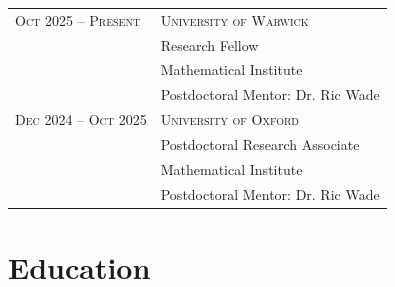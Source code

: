 \documentclass[a4paper,10pt]{article} %
\begin{document}
\begin{longtable}{>{\raggedleft\arraybackslash}p{4cm}p{10cm}}

\textsc{Oct 2025 -- Present} & \textsc{University of Warwick} \vspace{0.2em} \\
& Research Fellow \\
& Mathematical Institute \\
& \quad Postdoctoral Mentor: Dr. Ric Wade \vspace{0.2em}\\

\textsc{Dec 2024 -- Oct 2025} & \textsc{University of Oxford} \vspace{0.2em} \\
& Postdoctoral Research Associate \\
& Mathematical Institute \\
& \quad Postdoctoral Mentor: Dr. Ric Wade

\end{longtable}


\section{Education}
\end{document}
